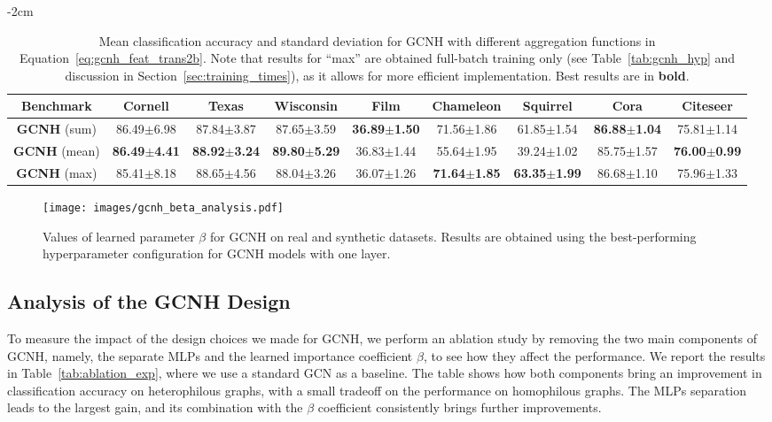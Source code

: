\documentclass[conference]{IEEEtran}
\begin{document}
\begin{table*}[t]
    \footnotesize
    \centering
    \addtolength{\leftskip} {-2cm}
    \addtolength{\rightskip}{-2cm}
\begin{tabular}{ c c c c c c c c c }
    \toprule
    \textbf{Benchmark} & \textbf{Cornell} & \textbf{Texas} & \textbf{Wisconsin} & \textbf{Film} & \textbf{Chameleon} & \textbf{Squirrel} & \textbf{Cora} & \textbf{Citeseer} \\
\midrule
    \textbf{GCNH} (sum) & 86.49$\pm$6.98 & 87.84$\pm$3.87 & 87.65$\pm$3.59 & \textbf{36.89$\pm$1.50} & 71.56$\pm$1.86 & 61.85$\pm$1.54 & \textbf{86.88$\pm$1.04} & 75.81$\pm$1.14 \\
    \textbf{GCNH} (mean) & \textbf{86.49$\pm$4.41} & \textbf{88.92$\pm$3.24} & \textbf{89.80$\pm$5.29} & 36.83$\pm$1.44 & 55.64$\pm$1.95 & 39.24$\pm$1.02 & 85.75$\pm$1.57 & \textbf{76.00$\pm$0.99} \\
\textbf{GCNH} (max) & 85.41$\pm$8.18 & 88.65$\pm$4.56 & 88.04$\pm$3.26 & 	36.07$\pm$1.26 & \textbf{71.64$\pm$1.85} & \textbf{63.35$\pm$1.99} & 86.68$\pm$1.10 & 75.96$\pm$1.33 \\
    \bottomrule

    \end{tabular}
    \caption{Mean classification accuracy and standard deviation for GCNH with different aggregation functions in Equation~\ref{eq:gcnh_feat_trans2b}. Note that results for ``max'' are obtained full-batch training only (see Table~\ref{tab:gcnh_hyp} and discussion in Section~\ref{sec:training_times}), as it allows for more efficient implementation. Best results are in \textbf{bold}.}
    \label{tab:aggfunc_exp}
\end{table*}



\begin{figure}[t]
\centering
\texttt{[image: images/gcnh\_beta\_analysis.pdf]}
\caption{Values of learned parameter $\beta$ for GCNH on real and synthetic datasets. Results are obtained using the best-performing hyperparameter configuration for GCNH models with one layer.}
\label{fig:gcnh_beta_analysis}
\end{figure}

\subsection{Analysis of the GCNH Design}\label{sec:experiments-analysis}
To measure the impact of the design choices we made for GCNH, we perform an ablation study by removing the two main components of GCNH, namely, the separate MLPs and the learned importance coefficient $\beta$, to see how they affect the performance.
We report the results in Table~\ref{tab:ablation_exp}, where we use a standard GCN as a baseline.
The table shows how both components bring an improvement in classification accuracy on heterophilous graphs, with a small tradeoff on the performance on homophilous graphs.
The MLPs separation leads to the largest gain, and its combination with the $\beta$ coefficient consistently brings further improvements.
\end{document}
